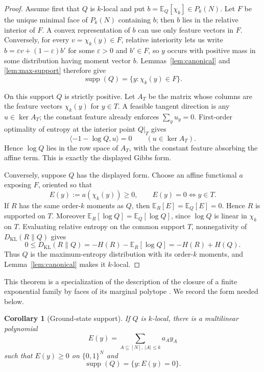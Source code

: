 \documentclass{article}
\newcommand{\supp}{\operatorname{supp}}
\newcommand{\E}{\mathbb{E}}
\newcommand{\bits}{\{0,1\}}
\newtheorem{corollary}{Corollary}
\begin{document}
\begin{proof}
Assume first that $Q$ is $k$-local and put
$b=\E_Q[\chi_k]\in P_k(N)$.  Let $F$ be the unique minimal face of $P_k(N)$
containing $b$; then $b$ lies in the relative interior of $F$.  A convex
representation of $b$ can use only feature vectors in $F$.  Conversely, for
every $v=\chi_k(y)\in F$, relative interiority lets us write
$b=\varepsilon v+(1-\varepsilon)b'$ for some $\varepsilon>0$ and $b'\in F$,
so $y$ occurs with positive mass in some distribution having moment vector
$b$.  Lemmas~\ref{lem:canonical} and \ref{lem:max-support} therefore give
\[
  \supp(Q)=\{y:\chi_k(y)\in F\}.
\]

On this support $Q$ is strictly positive.  Let $A_T$ be the matrix whose
columns are the feature vectors $\chi_k(y)$ for $y\in T$.  A feasible tangent
direction is any $u\in\ker A_T$; the constant feature already enforces
$\sum_y u_y=0$.  First-order optimality of entropy at the interior point
$Q|_T$ gives
\[
  \langle -1-\log Q,u\rangle=0
  \qquad(u\in\ker A_T).
\]
Hence $\log Q$ lies in the row space of $A_T$, with the constant feature
absorbing the affine term.  This is exactly the displayed Gibbs form.

Conversely, suppose $Q$ has the displayed form.  Choose an affine functional
$a$ exposing $F$, oriented so that
\[
  E(y):=a(\chi_k(y))\ge0,
  \qquad E(y)=0\Longleftrightarrow y\in T.
\]
If $R$ has the same order-$k$ moments as $Q$, then
$\E_R[E]=\E_Q[E]=0$.  Hence $R$ is supported on $T$.  Moreover
$\E_R[\log Q]=\E_Q[\log Q]$, since $\log Q$ is linear in $\chi_k$ on $T$.
Evaluating relative entropy on the common support $T$, nonnegativity of
$D_{\mathrm{KL}}(R\|Q)$ gives
\[
  0\le D_{\mathrm{KL}}(R\|Q)
  =-H(R)-\E_R[\log Q]
  =-H(R)+H(Q).
\]
Thus $Q$ is the maximum-entropy distribution with its order-$k$ moments, and
Lemma~\ref{lem:canonical} makes it $k$-local.
\end{proof}

This theorem is a specialization of the description of the closure of a finite
exponential family by faces of its marginal polytope
\cite{rauh11,malago11}.  We record the form needed below.

\begin{corollary}[Ground-state support]\label{cor:ground-state}
If $Q$ is $k$-local, there is a multilinear polynomial
\[
  E(y)=\sum_{A\subseteq[N],\ |A|\le k}a_A y_A
\]
such that $E(y)\ge0$ on $\bits^N$ and
\[
  \supp(Q)=\{y:E(y)=0\}.
\]
\end{corollary}
\end{document}
